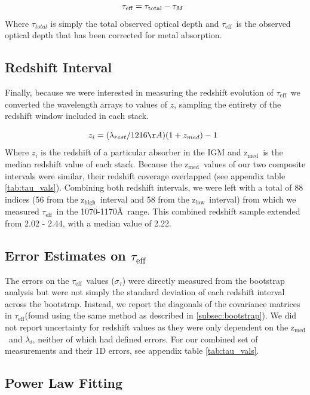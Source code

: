 \documentclass[twocolumn,tight,times]{aastex63}
\newcommand{\mteff}{\tau_\mathrm{eff}}
\newcommand{\teff}{$\mteff$}
\newcommand{\zem}{$\mathrm{z_{med}}$}
\newcommand{\hiz}{$\mathrm{z_{high}}$}
\newcommand{\loz}{$\mathrm{z_{low}}$}
\begin{document}
\begin{equation}
        \tau_{\rm eff} = \tau_{\rm total} - \tau_{M}\;\;
        \label{eq:corrected}
\end{equation}
Where $\tau_{total}$ is simply the total observed optical depth and \teff\ is the observed optical depth that has been corrected for metal absorption. 

\subsection{Redshift Interval}

Finally, because we were interested in measuring the redshift evolution of \teff\, we converted the wavelength arrays to values of $z$, sampling the entirety of the redshift window included in each stack.

\begin{equation}
        z_{i} = (\lambda_{rest}/1216\AA)(1 + z_{med}) - 1  \;\; 
        \label{eq:zi}
\end{equation}
Where $z_{i}$ is the redshift of a particular absorber in the IGM and \zem\ is the median redshift value of each stack. Because the \zem\ values of our two composite intervals were similar, their redshift coverage overlapped (see appendix table \ref{tab:tau_vals}). Combining both redshift intervals, we were left with a total of 88 indices (56 from the \hiz\ interval and 58 from the \loz\ interval) from which we measured \teff\ in the 1070-1170\AA\ range. This combined redshift sample extended from 2.02 - 2.44, with a median value of 2.22.

\subsection{Error Estimates on \teff}

The errors on the \teff\ values ($\sigma_{\tau}$) were directly measured from the bootstrap analysis but were not simply the standard deviation of each redshift interval across the bootstrap. Instead, we report the diagonals of the covariance matrices in \teff (found using the same method as described in \ref{subsec:bootstrap}). We did not report uncertainty for redshift values as they were only dependent on the \zem\ and $\lambda_{i}$, neither of which had defined errors. For our combined set of measurements and their 1D errors, see appendix table \ref{tab:tau_vals}.

\subsection{Power Law Fitting}
\end{document}
